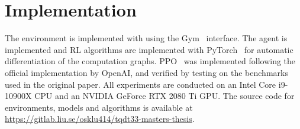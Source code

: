 %

\section{Implementation}

The environment is implemented with using the Gym~\cite{brockman_gym_2016} interface. The agent is implemented and RL algorithms are implemented with PyTorch~\cite{paszke_pytorch_nodate} for automatic differentiation of the computation graphs.
PPO~\cite{schulman_ppo_2017} was implemented following the official implementation by OpenAI,
and verified by testing on the benchmarks used in the original paper.
All experiments are conducted on an Intel Core i9-10900X CPU and an NVIDIA GeForce RTX 2080 Ti GPU.
The source code for environments, models and algorithms is available at \url{https://gitlab.liu.se/osklu414/tqdt33-masters-thesis}.
